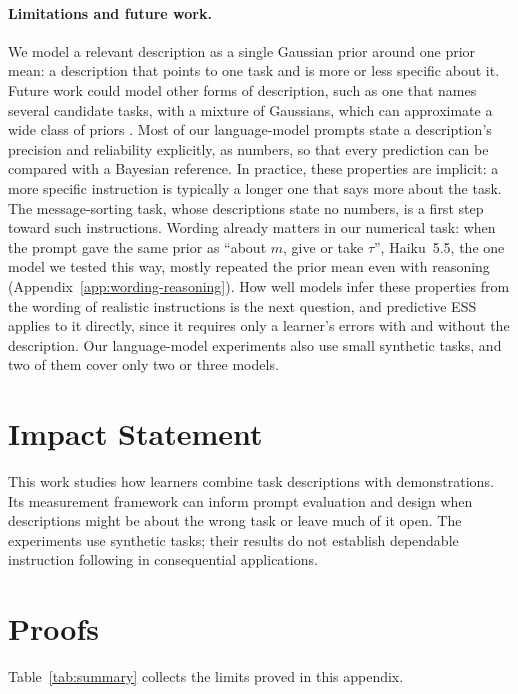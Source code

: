 \documentclass{article}
\theoremstyle{definition}
\begin{document}
\paragraph{Limitations and future work.}
We model a relevant description as a single Gaussian prior around one prior mean: a description that points to one task and is more or less specific about it. Future work could model other forms of description, such as one that names several candidate tasks, with a mixture of Gaussians, which can approximate a wide class of priors \citep{dalal1983}. Most of our language-model prompts state a description's precision and reliability explicitly, as numbers, so that every prediction can be compared with a Bayesian reference. In practice, these properties are implicit: a more specific instruction is typically a longer one that says more about the task. The message-sorting task, whose descriptions state no numbers, is a first step toward such instructions. Wording already matters in our numerical task: when the prompt gave the same prior as ``about $m$, give or take $\tau$'', Haiku~5.5, the one model we tested this way, mostly repeated the prior mean even with reasoning (Appendix~\ref{app:wording-reasoning}). How well models infer these properties from the wording of realistic instructions is the next question, and predictive ESS applies to it directly, since it requires only a learner's errors with and without the description. Our language-model experiments also use small synthetic tasks, and two of them cover only two or three models.

\section*{Impact Statement}
This work studies how learners combine task descriptions with demonstrations. Its measurement framework can inform prompt evaluation and design when descriptions might be about the wrong task or leave much of it open. The experiments use synthetic tasks; their results do not establish dependable instruction following in consequential applications.


\clearpage
\onecolumn
\appendix
\section{Proofs}\label{app:proofs}

Table~\ref{tab:summary} collects the limits proved in this appendix.
\end{document}
